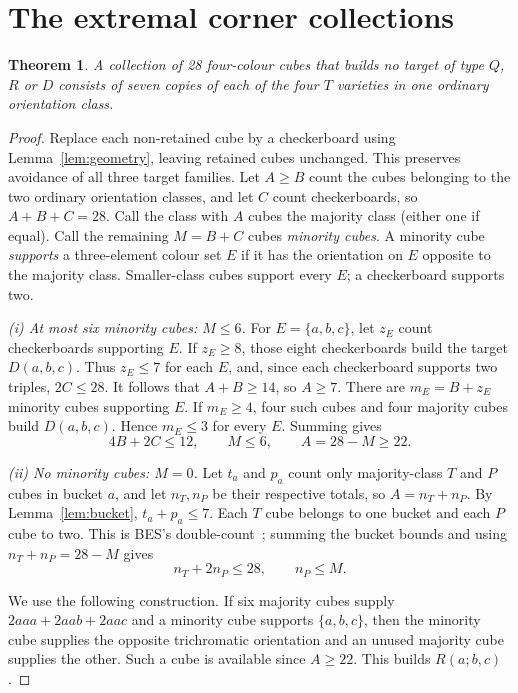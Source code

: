 \documentclass[11pt]{article}
\newtheorem{theorem}{Theorem}
\theoremstyle{remark}
\begin{document}
\section{The extremal corner collections}\label{sec:corners}
\begin{theorem}\label{thm:classification}
A collection of 28 four-colour cubes that builds no target of type $Q$,
$R$ or $D$ consists of seven copies of each of the four $T$ varieties
in one ordinary orientation class.
\end{theorem}
\begin{proof}
Replace each non-retained cube by a checkerboard using
Lemma~\ref{lem:geometry}, leaving retained cubes unchanged. This preserves
avoidance of all three target families.
Let $A\ge B$ count the cubes belonging to the two ordinary orientation
classes, and let $C$ count checkerboards, so $A+B+C=28$. Call the class with
$A$ cubes the majority class (either one if equal). Call the remaining $M=B+C$ cubes \emph{minority cubes}.
A minority cube \emph{supports} a three-element colour set $E$ if it has
the orientation on $E$ opposite to the majority class. Smaller-class
cubes support every $E$; a checkerboard supports two.

\smallskip\noindent\emph{(i) At most six minority cubes: $M\le6$.}
For $E=\{a,b,c\}$, let $z_E$ count checkerboards supporting $E$.
If $z_E\ge8$, those eight checkerboards build the
target $D(a,b,c)$. Thus $z_E\le7$ for each
$E$, and, since each checkerboard supports two triples, $2C\le28$.
It follows that $A+B\ge14$, so $A\ge7$. There are $m_E=B+z_E$
minority cubes supporting $E$. If $m_E\ge4$, four such cubes and four majority cubes
build $D(a,b,c)$. Hence
$m_E\le3$ for every $E$. Summing gives
\begin{equation}\label{eq:minority}
 4B+2C\le12,\qquad M\le6,\qquad A=28-M\ge22.
\end{equation}

\smallskip\noindent\emph{(ii) No minority cubes: $M=0$.}
Let $t_a$ and $p_a$ count only majority-class $T$ and $P$
cubes in bucket $a$, and let $n_T,n_P$ be their respective totals, so
$A=n_T+n_P$. By Lemma~\ref{lem:bucket}, $t_a+p_a\le7$.
Each $T$ cube belongs to one bucket and each $P$ cube to two. This is BES's
double-count~\cite[equation (1)]{BES}; summing the bucket bounds and using
$n_T+n_P=28-M$ gives
\begin{equation}\label{eq:buckets}
 n_T+2n_P\le28,\qquad n_P\le M.
\end{equation}

We use the following construction. If six majority cubes
supply $2aaa+2aab+2aac$ and a minority cube supports $\{a,b,c\}$, then
the minority cube supplies the opposite trichromatic orientation and an
unused majority cube supplies the other. Such a cube is available since
$A\ge22$. This builds $R(a;b,c)$.


\end{proof}
\end{document}
